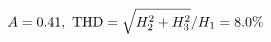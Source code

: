 \documentclass[preview]{standalone}
\begin{document}
\begin{align*}
\special{dvisvgm:raw <g id='unique000'>}A=0.41,\ \text{THD}=\sqrt{H_2^2+H_3^2}/H_1=8.0\%\special{dvisvgm:raw </g>}
\end{align*}
\end{document}
